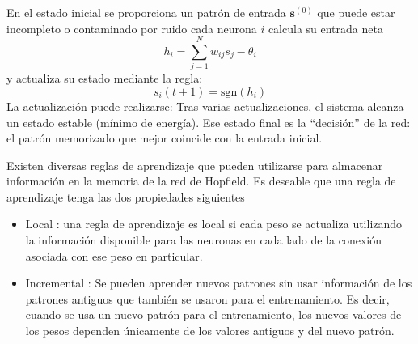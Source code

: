 En el estado inicial se proporciona un patrón de entrada $\mathbf{s}^{(0)}$ que puede estar incompleto o contaminado por ruido cada neurona $i$ calcula su entrada neta \[
    h_i = \sum_{j=1}^{N} w_{ij} s_j - \theta_i
    \] y actualiza su estado mediante la regla: \[
    s_i(t+1) = \text{sgn}(h_i)
    \] La actualización puede realizarse: Tras varias actualizaciones, el sistema alcanza un estado estable (mínimo de energía). Ese estado final es la ``decisión'' de la red: el patrón memorizado que mejor coincide con la entrada inicial.

Existen diversas reglas de aprendizaje que pueden utilizarse para almacenar información en la memoria de la red de Hopfield. Es deseable que una regla de aprendizaje tenga las dos propiedades siguientes
\begin{itemize}
    \item Local : una regla de aprendizaje es local si cada peso se actualiza utilizando la información disponible para las neuronas en cada lado de la conexión asociada con ese peso en particular.

    \item Incremental : Se pueden aprender nuevos patrones sin usar información de los patrones antiguos que también se usaron para el entrenamiento. Es decir, cuando se usa un nuevo patrón para el entrenamiento, los nuevos valores de los pesos dependen únicamente de los valores antiguos y del nuevo patrón. 

\end{itemize}
